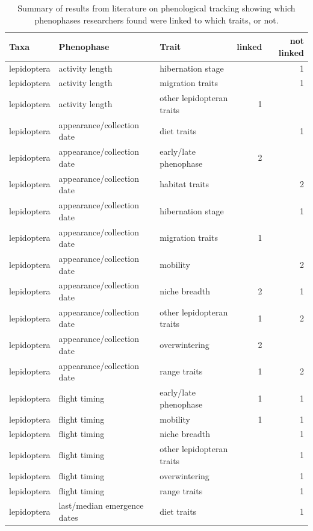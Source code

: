 \documentclass[11pt,letter]{article}
\begin{document}
\begin{table}[ht]
\centering
\caption{Summary of results from literature on phenological tracking showing which phenophases researchers found were linked to which traits, or not.} 
\label{tab:meta2}
\begingroup\footnotesize
\begin{tabular}{lllrr}
  \hline
Taxa & Phenophase & Trait & linked & not linked \\ 
  \hline
lepidoptera & activity length & hibernation stage &  &   1 \\ 
  lepidoptera & activity length & migration traits &  &   1 \\ 
  lepidoptera & activity length & other lepidopteran traits &   1 &  \\ 
  lepidoptera & appearance/collection date & diet traits &  &   1 \\ 
  lepidoptera & appearance/collection date & early/late phenophase &   2 &  \\ 
  lepidoptera & appearance/collection date & habitat traits &  &   2 \\ 
  lepidoptera & appearance/collection date & hibernation stage &  &   1 \\ 
  lepidoptera & appearance/collection date & migration traits &   1 &  \\ 
  lepidoptera & appearance/collection date & mobility &  &   2 \\ 
  lepidoptera & appearance/collection date & niche breadth &   2 &   1 \\ 
  lepidoptera & appearance/collection date & other lepidopteran traits &   1 &   2 \\ 
  lepidoptera & appearance/collection date & overwintering &   2 &  \\ 
  lepidoptera & appearance/collection date & range traits &   1 &   2 \\ 
  lepidoptera & flight timing & early/late phenophase &   1 &   1 \\ 
  lepidoptera & flight timing & mobility &   1 &   1 \\ 
  lepidoptera & flight timing & niche breadth &  &   1 \\ 
  lepidoptera & flight timing & other lepidopteran traits &  &   1 \\ 
  lepidoptera & flight timing & overwintering &  &   1 \\ 
  lepidoptera & flight timing & range traits &  &   1 \\ 
  lepidoptera & last/median emergence dates & diet traits &  &   1 \\ 

\end{tabular}
\end{table}
\end{document}
